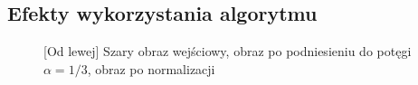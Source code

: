 \documentclass[a4paper,12pt, titlepage]{report}
\begin{document}
\subsection*{Efekty wykorzystania algorytmu}
\begin{figure}[h]
    \centering
    \caption{[Od lewej] Szary obraz wejściowy, obraz po podniesieniu do potęgi \(\alpha=1/3\), obraz po normalizacji}%
    \label{fig:geo_after_grey1}%
\end{figure}
\FloatBarrier
\end{document}
